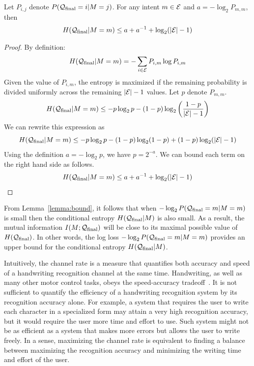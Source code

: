 \documentclass{sigchi}
\begin{document}
\begin{lemma}
\label{lemma:bound}
Let $P_{i,j}$ denote $P(\mathcal{Q}_{\mathrm{final}} = i | M = j)$. For any intent $m \in \mathcal{E}$ and $a = -\log_2 P_{m,m}$, then 
\[ H(\mathcal{Q}_{\mathrm{final}} | M=m) \leq a + a^{-1} + \log_2
(|\mathcal{E}|-1) \]
\end{lemma}
\begin{proof}
By definition:
\[ H(\mathcal{Q}_{\mathrm{final}} | M=m) = -\displaystyle\sum_{i \in \mathcal{E}} P_{i,m} \log P_{i,m}\]
Given the value of $P_{i,m}$, the entropy is maximized if the
remaining probability is divided uniformly across the remaining $|\mathcal{E}|-1$
values. Let $p$ denote $P_{m,m}$.
\[
 H(\mathcal{Q}_{\mathrm{final}} | M=m) \leq -p \log_2 p - (1-p) \log_2 \left(\frac{1-p}{|\mathcal{E}|-1}\right)
\]
We can rewrite this expression as 
{
\small
\[
 H(\mathcal{Q}_{\mathrm{final}} | M=m) \leq -p \log_2 p - (1-p) \log_2 (1-p) +
 (1-p) \log_2 (|\mathcal{E}|-1)
\]
}
Using the definition $a = -\log_2 p$, we have $p = 2^{-a}$. We can
bound each term on the right hand side as follows. 
\[
 H(\mathcal{Q}_{\mathrm{final}} | M=m) \leq a + a^{-1} + \log_2 (|\mathcal{E}|-1)
\]
\end{proof}

From Lemma~\ref{lemma:bound}, it follows that when $-\log_2
P(\mathcal{Q}_{\mathrm{final}} = m | M = m)$ is small then the conditional entropy
$H(\mathcal{Q}_{\mathrm{final}} | M)$ is also small. As a result, the mutual
information $I( M ; \mathcal{Q}_{\mathrm{final}})$ will be close to its maximal
possible value of $H(\mathcal{Q}_{\mathrm{final}})$. In other words, the log loss
$-\log_2 P(\mathcal{Q}_{\mathrm{final}} = m | M = m)$ provides an upper bound for
the conditional entropy $H(\mathcal{Q}_{\mathrm{final}} | M)$.

Intuitively, the channel rate is a measure that quantifies both
accuracy and speed of a handwriting recognition channel at the same
time. Handwriting, as well as many other motor control tasks, obeys
the speed-accuracy tradeoff~\cite{Fitts1954}. It is not sufficient to
quantify the efficiency of a handwriting recognition system by its
recognition accuracy alone. For example, a system that requires the
user to write each character in a specialized form may attain a very
high recognition accuracy, but it would require the user more time and
effort to use. Such system might not be as efficient as a system that
makes more errors but allows the user to write freely. In a sense,
maximizing the channel rate is equivalent to finding a balance between
maximizing the recognition accuracy and minimizing the writing time
and effort of the user.
\end{document}
